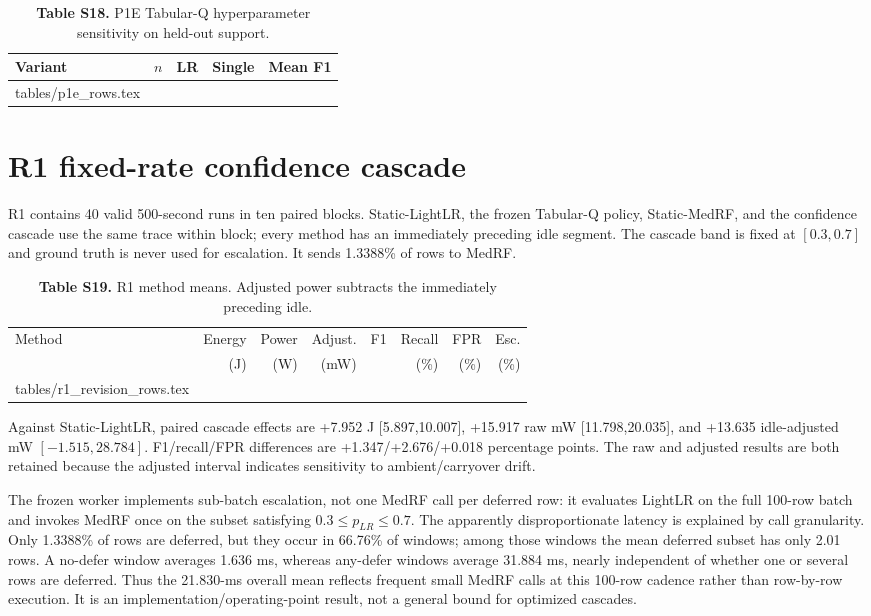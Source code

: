\documentclass[10pt,a4paper]{article}
\makeatletter
\newcommand{\tableinput}[1]{\@@input #1.tex }
\makeatother
\begin{document}
\begin{table}[h!]
\centering\footnotesize
\caption*{\textbf{Table S18.} P1E Tabular-Q hyperparameter sensitivity on held-out support.}
\begin{tabular}{lrrrr}\toprule
Variant & $n$ & LR & Single & Mean F1\\\midrule
\tableinput{tables/p1e_rows}
\bottomrule\end{tabular}
\end{table}

\clearpage
\section{R1 fixed-rate confidence cascade}
R1 contains 40 valid 500-second runs in ten paired blocks. Static-LightLR, the frozen Tabular-Q policy, Static-MedRF, and the confidence cascade use the same trace within block; every method has an immediately preceding idle segment. The cascade band is fixed at $[0.3,0.7]$ and ground truth is never used for escalation. It sends 1.3388\% of rows to MedRF.

\begin{table}[h!]
\centering\footnotesize
\caption*{\textbf{Table S19.} R1 method means. Adjusted power subtracts the immediately preceding idle.}
\setlength{\tabcolsep}{3.0pt}
\begin{tabular}{lrrrrrrr}\toprule
Method & Energy & Power & Adjust. & F1 & Recall & FPR & Esc.\\
 & (J) & (W) & (mW) & & (\%) & (\%) & (\%)\\\midrule
\tableinput{tables/r1_revision_rows}
\bottomrule\end{tabular}
\end{table}

Against Static-LightLR, paired cascade effects are +7.952 J [5.897,10.007], +15.917 raw mW [11.798,20.035], and +13.635 idle-adjusted mW $[-1.515,28.784]$. F1/recall/FPR differences are +1.347/+2.676/+0.018 percentage points. The raw and adjusted results are both retained because the adjusted interval indicates sensitivity to ambient/carryover drift.

The frozen worker implements sub-batch escalation, not one MedRF call per deferred row: it evaluates LightLR on the full 100-row batch and invokes MedRF once on the subset satisfying $0.3\le p_{LR}\le0.7$. The apparently disproportionate latency is explained by call granularity. Only 1.3388\% of rows are deferred, but they occur in 66.76\% of windows; among those windows the mean deferred subset has only 2.01 rows. A no-defer window averages 1.636 ms, whereas any-defer windows average 31.884 ms, nearly independent of whether one or several rows are deferred. Thus the 21.830-ms overall mean reflects frequent small MedRF calls at this 100-row cadence rather than row-by-row execution. It is an implementation/operating-point result, not a general bound for optimized cascades.
\end{document}
